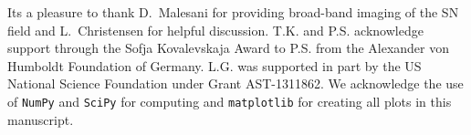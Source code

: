 \documentclass[traditabstract]{aa}
\begin{document}
\begin{acknowledgements}

Its a pleasure to thank D.~Malesani for providing broad-band imaging of the SN field and L.~Christensen for helpful discussion. T.K. and P.S. acknowledge support through the Sofja Kovalevskaja Award to P.S. from the Alexander von Humboldt Foundation of Germany. L.G. was supported in part by the US National Science Foundation under Grant AST-1311862. We acknowledge the use of \texttt{NumPy} and \texttt{SciPy} \citep{Walt:2011:NAS:1957373.1957466} for computing and \texttt{matplotlib} \citep{Hunter:2007} for creating all plots in this manuscript. 

\end{acknowledgements}



\end{document}
